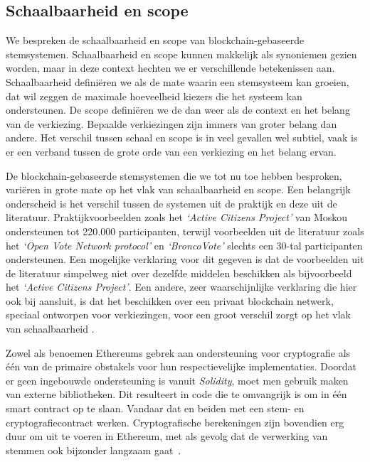 	\subsection{Schaalbaarheid en scope}
	We bespreken de schaalbaarheid en scope van blockchain-gebaseerde stemsystemen. Schaalbaarheid en scope kunnen makkelijk als synoniemen gezien worden, maar in deze context hechten we er verschillende betekenissen aan. Schaalbaarheid definiëren we als de mate waarin een stemsysteem kan groeien, dat wil zeggen de maximale hoeveelheid kiezers die het systeem kan ondersteunen. De scope definiëren we de dan weer als de context en het belang van de verkiezing. Bepaalde verkiezingen zijn immers van groter belang dan andere. Het verschil tussen schaal en scope is in veel gevallen wel subtiel, vaak is er een verband tussen de grote orde van een verkiezing en het belang ervan.
	
	De blockchain-gebaseerde stemsystemen die we tot nu toe hebben besproken, variëren in grote mate op het vlak van schaalbaarheid en scope. Een belangrijk onderscheid is het verschil tussen de systemen uit de praktijk en deze uit de literatuur. Praktijkvoorbeelden zoals het  \textit{`Active Citizens Project'} van Moskou ondersteunen tot 220.000 participanten, terwijl voorbeelden uit de literatuur zoals het  \textit{`Open Vote Network protocol'} en  \textit{`BroncoVote'} slechts een 30-tal participanten ondersteunen. Een mogelijke verklaring voor dit gegeven is dat de voorbeelden uit de literatuur simpelweg niet over dezelfde middelen beschikken als bijvoorbeeld het \textit{`Active Citizens Project'}. Een andere, zeer waarschijnlijke verklaring die hier ook bij aansluit, is dat het beschikken over een privaat blockchain netwerk, speciaal ontworpen voor verkiezingen, voor een groot verschil zorgt op het vlak van schaalbaarheid .
	
	 Zowel \textcite{McCorry2017} als \textcite{Dagher2018} benoemen Ethereums gebrek aan ondersteuning voor cryptografie als één van de primaire obstakels voor hun respectievelijke implementaties. Doordat er geen ingebouwde ondersteuning is vanuit \textit{Solidity}, moet men gebruik maken van externe bibliotheken. Dit resulteert in code die te omvangrijk is om in één smart contract op te slaan. Vandaar dat  \textcite{McCorry2017} en \textcite{Dagher2018} beiden met een stem- en cryptografiecontract werken. Cryptografische berekeningen zijn bovendien erg duur om uit te voeren in Ethereum, met als gevolg dat de verwerking van stemmen ook bijzonder langzaam gaat~\autocite{Dagher2018}.
	 

